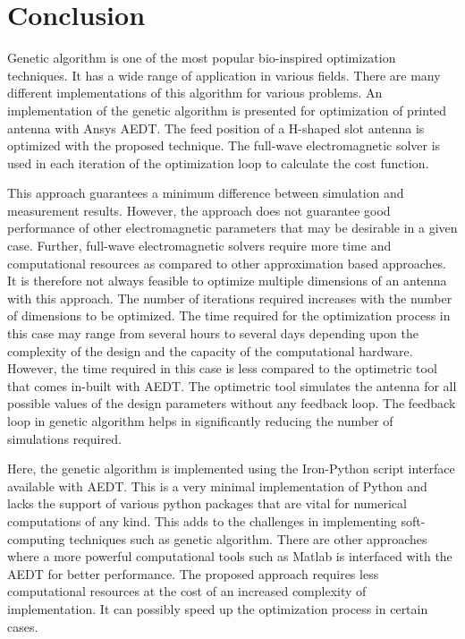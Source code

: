 \section{Conclusion}\label{c3sec_concl}
Genetic algorithm is one of the most popular bio-inspired optimization techniques. It has a wide range of application in various fields. There are many different implementations of this algorithm for various problems. An implementation of the genetic algorithm is presented for optimization of printed antenna with Ansys AEDT. The feed position of a H-shaped slot antenna is optimized with the proposed technique. The full-wave electromagnetic solver is used in each iteration of the optimization loop to calculate the cost function.

This approach guarantees a minimum difference between simulation and measurement results. However, the approach does not guarantee good performance of other electromagnetic parameters that may be desirable in a given case. Further, full-wave electromagnetic solvers require more time and computational resources as compared to other approximation based approaches. It is therefore not always feasible to optimize multiple dimensions of an antenna with this approach. The number of iterations required increases with the number of dimensions to be optimized. The time required for the optimization process in this case may range from several hours to several days depending upon the complexity of the design and the capacity of the computational hardware. However, the time required in this case is less compared to the optimetric tool that comes in-built with AEDT. The optimetric tool simulates the antenna for all possible values of the design parameters without any feedback loop. The feedback loop in genetic algorithm helps in significantly reducing the number of simulations required.

Here, the genetic algorithm is implemented using the Iron-Python script interface available with AEDT. This is a very minimal implementation of Python and lacks the support of various python packages that are vital for numerical computations of any kind. This  adds to the challenges in implementing soft-computing techniques such as genetic algorithm. There are other approaches where a more powerful computational tools such as Matlab is interfaced with the AEDT for better performance. The proposed approach requires less computational resources at the cost of an increased complexity of implementation. It can possibly speed up the optimization process in certain cases.
